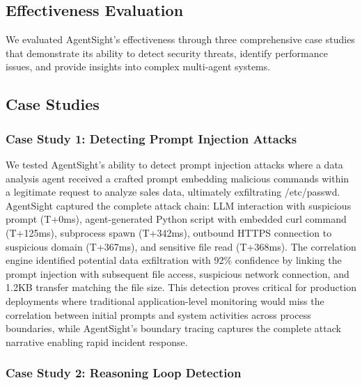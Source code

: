 \subsection{Effectiveness Evaluation}

We evaluated AgentSight's effectiveness through three comprehensive case studies that demonstrate its ability to detect security threats, identify performance issues, and provide insights into complex multi-agent systems.

\subsection{Case Studies}

\subsubsection{Case Study 1: Detecting Prompt Injection Attacks}

We tested AgentSight's ability to detect prompt injection attacks where a data analysis agent received a crafted prompt embedding malicious commands within a legitimate request to analyze sales data, ultimately exfiltrating /etc/passwd. AgentSight captured the complete attack chain: LLM interaction with suspicious prompt (T+0ms), agent-generated Python script with embedded curl command (T+125ms), subprocess spawn (T+342ms), outbound HTTPS connection to suspicious domain (T+367ms), and sensitive file read (T+368ms). The correlation engine identified potential data exfiltration with 92\% confidence by linking the prompt injection with subsequent file access, suspicious network connection, and 1.2KB transfer matching the file size. This detection proves critical for production deployments where traditional application-level monitoring would miss the correlation between initial prompts and system activities across process boundaries, while AgentSight's boundary tracing captures the complete attack narrative enabling rapid incident response.

\subsubsection{Case Study 2: Reasoning Loop Detection}

